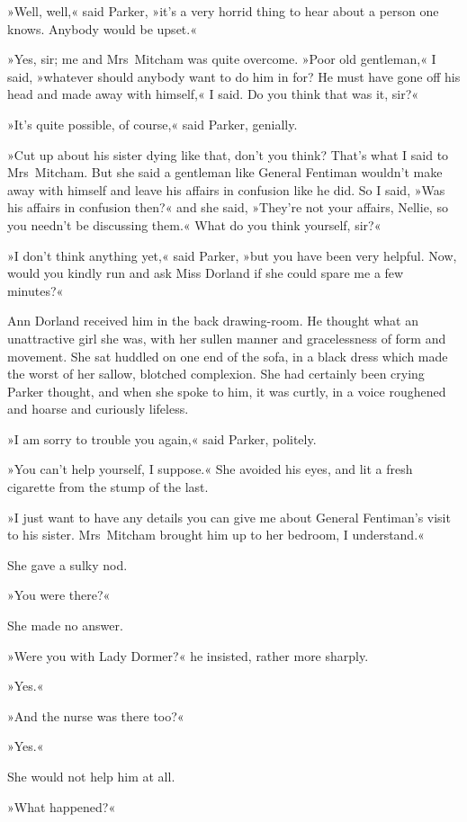 »Well, well,« said Parker, »it's a very horrid thing to hear about a person one knows. Anybody would be upset.«

»Yes, sir; me and Mrs~Mitcham was quite overcome. »Poor old gentleman,« I said, »whatever should anybody want to do him in for? He must have gone off his head and made away with himself,« I said. Do you think that was it, sir?«

»It's quite possible, of course,« said Parker, genially.

»Cut up about his sister dying like that, don't you think? That's what I said to Mrs~Mitcham. But she said a gentleman like General Fentiman wouldn't make away with himself and leave his affairs in confusion like he did. So I said, »Was his affairs in confusion then?« and she said, »They're not your affairs, Nellie, so you needn't be discussing them.« What do you think yourself, sir?«

»I don't think anything yet,« said Parker, »but you have been very helpful. Now, would you kindly run and ask Miss Dorland if she could spare me a few minutes?«

Ann Dorland received him in the back drawing-room. He thought what an unattractive girl she was, with her sullen manner and gracelessness of form and movement. She sat huddled on one end of the sofa, in a black dress which made the worst of her sallow, blotched complexion. She had certainly been crying Parker thought, and when she spoke to him, it was curtly, in a voice roughened and hoarse and curiously lifeless.

»I am sorry to trouble you again,« said Parker, politely.

»You can't help yourself, I suppose.« She avoided his eyes, and lit a fresh cigarette from the stump of the last.

»I just want to have any details you can give me about General Fentiman's visit to his sister. Mrs~Mitcham brought him up to her bedroom, I understand.«

She gave a sulky nod.

»You were there?«

She made no answer.

»Were you with Lady Dormer?« he insisted, rather more sharply.

»Yes.«

»And the nurse was there too?«

»Yes.«

She would not help him at all.

»What happened?«

